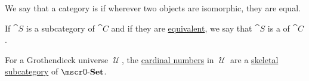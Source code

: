 \begin{definition}\label{def:skeletal_category}
  We say that a category is  if wherever two objects are isomorphic, they are equal.

  If \( \cat{S} \) is a subcategory of \( \cat{C} \) and if they are \hyperref[def:category_equivalence]{equivalent}, we say that \( \cat{S} \) is a  of \( \cat{C} \).
\end{definition}

\begin{example}\label{ex:skeleton_of_set}
  For a Grothendieck universe \( \mscrU \), the \hyperref[def:cardinal]{cardinal numbers} in \( \mscrU \) are a \hyperref[def:skeletal_category]{skeletal subcategory} of \( \ucat{Set} \).
\end{example}


